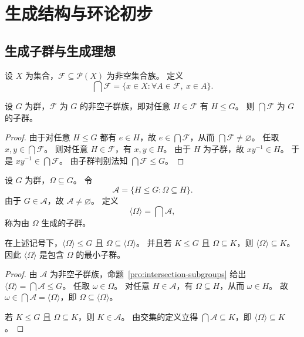 \documentclass[lang=cn,a4paper,newtx]{elegantbook}
\begin{document}
\chapter{生成结构与环论初步}

\section{生成子群与生成理想}

\begin{definition}[集合族的交]
设 $X$ 为集合，$\mathcal F\subseteq \mathcal P(X)$ 为非空集合族。
定义
\[
  \bigcap\mathcal F=\{x\in X:\forall A\in \mathcal F,\ x\in A\}.
\]
\end{definition}

\begin{proposition}\label{intersection-subgroups}
设 $G$ 为群，$\mathcal F$ 为 $G$ 的非空子群族，即对任意 $H\in \mathcal F$ 有 $H\le G$。
则 $\bigcap\mathcal F$ 为 $G$ 的子群。
\end{proposition}

\begin{proof}
由于对任意 $H\le G$ 都有 $e\in H$，故 $e\in \bigcap\mathcal F$，从而 $\bigcap\mathcal F\neq\varnothing$。
任取 $x,y\in \bigcap\mathcal F$。
则对任意 $H\in \mathcal F$，有 $x,y\in H$。
由于 $H$ 为子群，故 $xy^{-1}\in H$。
于是 $xy^{-1}\in \bigcap\mathcal F$。
由子群判别法知 $\bigcap\mathcal F\le G$。
\end{proof}

\begin{definition}[生成子群]
设 $G$ 为群，$\Omega\subseteq G$。
令
\[
  \mathcal A=\{H\le G:\Omega\subseteq H\}.
\]
由于 $G\in \mathcal A$，故 $\mathcal A\neq\varnothing$。
定义
\[
  \langle\Omega\rangle=\bigcap\mathcal A,
\]
称为由 $\Omega$ 生成的子群。
\end{definition}

\begin{proposition}
在上述记号下，$\langle\Omega\rangle\le G$ 且 $\Omega\subseteq \langle\Omega\rangle$。
并且若 $K\le G$ 且 $\Omega\subseteq K$，则 $\langle\Omega\rangle\subseteq K$。
因此 $\langle\Omega\rangle$ 是包含 $\Omega$ 的最小子群。
\end{proposition}

\begin{proof}
由 $\mathcal A$ 为非空子群族，命题~\ref{pro:intersection-subgroups} 给出 $\langle\Omega\rangle=\bigcap\mathcal A\le G$。
任取 $\omega\in \Omega$。
对任意 $H\in \mathcal A$，有 $\Omega\subseteq H$，从而 $\omega\in H$。
故 $\omega\in \bigcap\mathcal A=\langle\Omega\rangle$，即 $\Omega\subseteq \langle\Omega\rangle$。

若 $K\le G$ 且 $\Omega\subseteq K$，则 $K\in \mathcal A$。
由交集的定义立得 $\bigcap\mathcal A\subseteq K$，即 $\langle\Omega\rangle\subseteq K$。
\end{proof}
\end{document}
